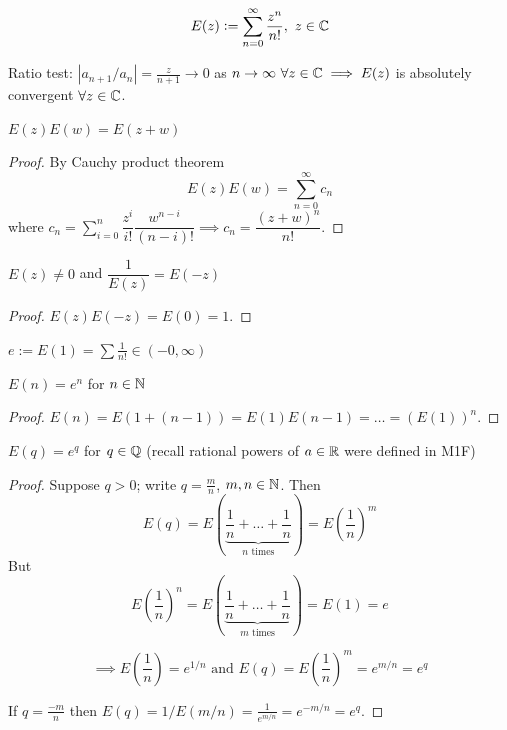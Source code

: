 \documentclass[twoside]{scrartcl}
\begin{document}
\vspace*{5pt}

\begin{definition}
\[E(z):= \sum_{n=0}^\infty \frac{z^n}{n!},~z\in\mathbb{C}\]

Ratio test: $|a_{n+1}/a_n| = \frac{z}{n+1} \to 0$ as $n \to \infty ~\forall z \in\mathbb{C}\implies E(z)$ is absolutely convergent $\forall z\in\mathbb{C}$.  
\end{definition}\vspace*{5pt}

\begin{proposition}
$E(z)E(w) = E(z + w)$
\end{proposition}
\begin{proof}
By Cauchy product theorem
\[E(z)E(w) = \sum_{n=0}^\infty c_n\]
where $c_n = \sum_{i=0}^n \dfrac{z^i}{i!}\dfrac{w^{n-i}}{(n-i)!} \implies c_n = \dfrac{(z+w)^n}{n!}$.
\end{proof}\vspace*{5pt}

\begin{corollary}
$E(z) \neq 0$ and $\dfrac{1}{E(z)} = E(-z)$
\end{corollary}
\begin{proof}
$E(z)E(-z) = E(0) = 1$.	
\end{proof}\vspace*{5pt}

\begin{definition}
$e:= E(1) = \sum \frac{1}{n!} \in (-0,\infty)$	
\end{definition}\vspace*{5pt}

\begin{corollary}
$E(n) = e^n$ for $n \in\mathbb{N}$	
\end{corollary}
\begin{proof}
	$E(n) = E(1 + (n-1)) = E(1)E(n-1) = \dots = (E(1))^n$.
\end{proof}\vspace*{5pt}

\begin{proposition}
$E(q) = e^q$ for $q \in\mathbb{Q}$ (recall rational powers of $a \in\mathbb{R}$ were defined in M1F)	
\end{proposition}
\begin{proof}
	Suppose $q > 0$; write $q = \frac{m}{n}$, $m,n \in\mathbb{N}$. Then 
	\[\textstyle{E(q) = E(\underbrace{\frac{1}{n} + \dots + \frac{1}{n}}_{n \text{ times}}) = E(\frac{1}{n})^m}\]
	But \[E(\frac{1}{n})^n = E(\underbrace{\frac{1}{n} + \dots + \frac{1}{n}}_{m \text{ times}}) = E(1) = e\]
	
	\[ \implies E(\frac{1}{n}) = e^{1/n}\text{ and }E(q) = E(\frac{1}{n})^m = e^{m/n} = e^q\]
	
	If $q = \frac{-m}{n}$ then $E(q) = 1/E(m/n) = \frac{1}{e^{m/n}} = e^{-m/n} = e^q$.
\end{proof}
\end{document}
